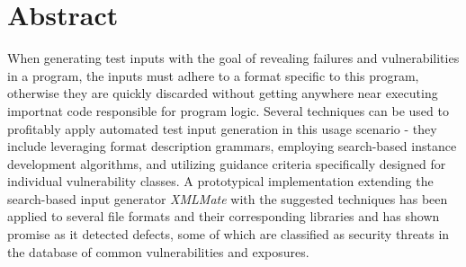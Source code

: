 \section*{Abstract}
When generating test inputs with the goal of revealing failures and vulnerabilities in a program, 
the inputs must adhere to a format specific to this program, otherwise they are 
quickly discarded without getting anywhere near executing importnat code responsible for program logic.
Several techniques can be used to profitably apply automated test input generation in this usage scenario -
they include leveraging format description grammars, employing search-based instance development algorithms,
and utilizing guidance criteria specifically designed for individual vulnerability classes.
A prototypical implementation extending the search-based input generator \emph{XMLMate} with the suggested
techniques has been applied to several file formats and their corresponding libraries and has shown promise as
it detected defects, some of which are classified as security threats in the database of common
vulnerabilities and exposures. 
